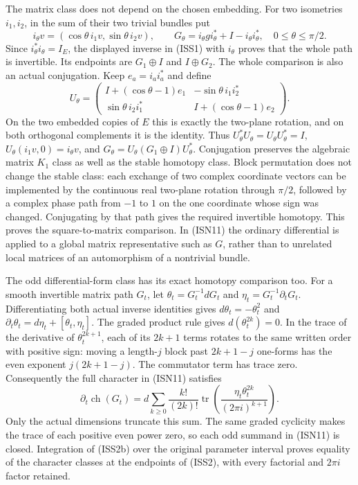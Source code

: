 \documentclass[
  11pt,
]{article}
\begin{document}
The matrix class does not depend on the chosen embedding. For two
isometries \(i_1,i_2\), in the sum of their two trivial bundles put \[
 i_\theta v=(\cos\theta\,i_1v,\sin\theta\,i_2v),\qquad
 G_\theta=i_\theta g i_\theta^*+I-i_\theta i_\theta^*,
 \quad 0\leq\theta\leq\pi/2 .
 \tag{ISS2}
\] Since \(i_\theta^*i_\theta=I_E\), the displayed inverse in (ISS1)
with \(i_\theta\) proves that the whole path is invertible. Its
endpoints are \(G_1\oplus I\) and \(I\oplus G_2\). The whole comparison
is also an actual conjugation. Keep \(e_a=i_ai_a^*\) and define \[
 U_\theta=
 \begin{pmatrix}
 I+(\cos\theta-1)e_1&-\sin\theta\,i_1i_2^*\\
 \sin\theta\,i_2i_1^*&I+(\cos\theta-1)e_2
 \end{pmatrix}.
 \tag{ISS2a}
\] On the two embedded copies of \(E\) this is exactly the two-plane
rotation, and on both orthogonal complements it is the identity. Thus
\(U_\theta^*U_\theta=U_\theta U_\theta^*=I\),
\(U_\theta(i_1v,0)=i_\theta v\), and
\(G_\theta=U_\theta(G_1\oplus I)U_\theta^*\). Conjugation preserves the
algebraic matrix \(K_1\) class as well as the stable homotopy class.
Block permutation does not change the stable class: each exchange of two
complex coordinate vectors can be implemented by the continuous real
two-plane rotation through \(\pi/2\), followed by a complex phase path
from \(-1\) to \(1\) on the one coordinate whose sign was changed.
Conjugating by that path gives the required invertible homotopy. This
proves the square-to-matrix comparison. In (ISN11) the ordinary
differential is applied to a global matrix representative such as \(G\),
rather than to unrelated local matrices of an automorphism of a
nontrivial bundle.

The odd differential-form class has its exact homotopy comparison too.
For a smooth invertible matrix path \(G_t\), let
\(\theta_t=G_t^{-1}dG_t\) and \(\eta_t=G_t^{-1}\partial_tG_t\).
Differentiating both actual inverse identities gives
\(d\theta_t=-\theta_t^2\) and
\(\partial_t\theta_t=d\eta_t+[\theta_t,\eta_t]\). The graded product
rule gives \(d(\theta_t^{2k})=0\). In the trace of the derivative of
\(\theta_t^{2k+1}\), each of its \(2k+1\) terms rotates to the same
written order with positive sign: moving a length-\(j\) block past
\(2k+1-j\) one-forms has the even exponent \(j(2k+1-j)\). The commutator
term has trace zero. Consequently the full character in (ISN11)
satisfies \[
 \partial_t\operatorname{ch}(G_t)
 =d\sum_{k\geq0}\frac{k!}{(2k)!}
       \operatorname{tr}
        \left(\frac{\eta_t\theta_t^{2k}}{(2\pi i)^{k+1}}\right).
 \tag{ISS2b}
\] Only the actual dimensions truncate this sum. The same graded
cyclicity makes the trace of each positive even power zero, so each odd
summand in (ISN11) is closed. Integration of (ISS2b) over the original
parameter interval proves equality of the character classes at the
endpoints of (ISS2), with every factorial and \(2\pi i\) factor
retained.
\end{document}
